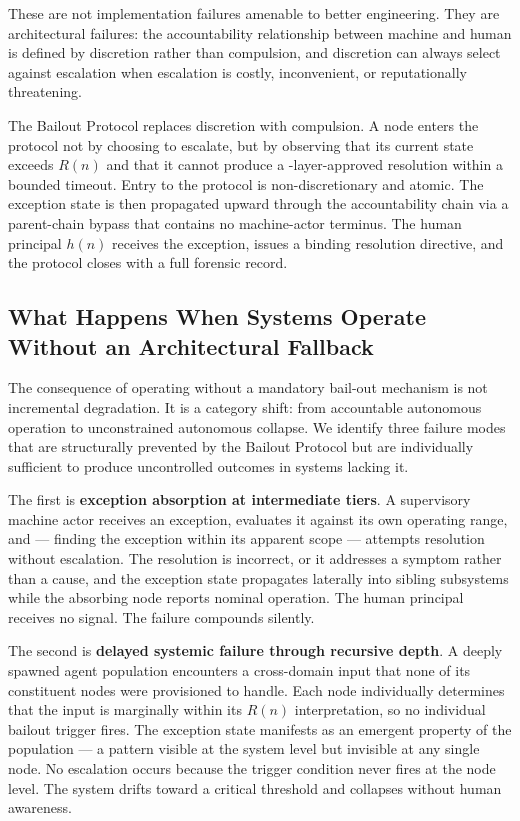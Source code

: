These are not implementation failures amenable to better engineering. They are architectural failures: the accountability relationship between machine and human is defined by discretion rather than compulsion, and discretion can always select against escalation when escalation is costly, inconvenient, or reputationally threatening.

The Bailout Protocol replaces discretion with compulsion. A node enters the protocol not by choosing to escalate, but by observing that its current state exceeds $R(n)$ and that it cannot produce a \fact-layer-approved resolution within a bounded timeout. Entry to the protocol is non-discretionary and atomic. The exception state is then propagated upward through the accountability chain via a parent-chain bypass that contains no machine-actor terminus. The human principal $h(n)$ receives the exception, issues a binding resolution directive, and the protocol closes with a full forensic record.

\subsection{What Happens When Systems Operate Without an Architectural Fallback}

The consequence of operating without a mandatory bail-out mechanism is not incremental degradation. It is a category shift: from accountable autonomous operation to unconstrained autonomous collapse. We identify three failure modes that are structurally prevented by the Bailout Protocol but are individually sufficient to produce uncontrolled outcomes in systems lacking it.

The first is \textbf{exception absorption at intermediate tiers}. A supervisory machine actor receives an exception, evaluates it against its own operating range, and --- finding the exception within its apparent scope --- attempts resolution without escalation. The resolution is incorrect, or it addresses a symptom rather than a cause, and the exception state propagates laterally into sibling subsystems while the absorbing node reports nominal operation. The human principal receives no signal. The failure compounds silently.

The second is \textbf{delayed systemic failure through recursive depth}. A deeply spawned agent population encounters a cross-domain input that none of its constituent nodes were provisioned to handle. Each node individually determines that the input is marginally within its $R(n)$ interpretation, so no individual bailout trigger fires. The exception state manifests as an emergent property of the population --- a pattern visible at the system level but invisible at any single node. No escalation occurs because the trigger condition never fires at the node level. The system drifts toward a critical threshold and collapses without human awareness.

